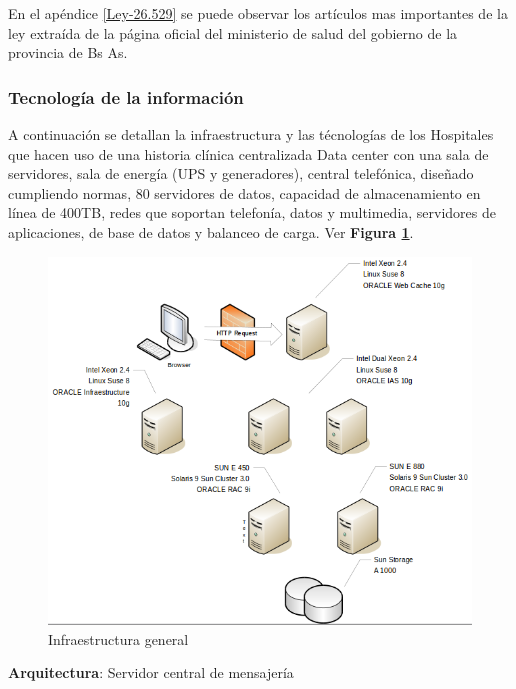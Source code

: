 En el apéndice \ref{Ley-26.529} se puede observar los artículos mas importantes de la ley extraída de la página oficial del ministerio de salud del gobierno de la provincia de Bs As.




\subsubsection{Tecnología de la información}
 A continuación se detallan la infraestructura y las técnologías de los Hospitales que hacen uso de una historia clínica centralizada
 Data center con una sala de servidores, sala de energía (UPS y generadores), central telefónica, diseñado cumpliendo normas, 80 servidores de datos, capacidad de almacenamiento en línea de 400TB, redes que soportan telefonía, datos y multimedia, servidores de aplicaciones, de base de datos y balanceo de carga.
 Ver \textbf{Figura \ref{infgen}}.
 
\begin{figure}
  \centering
  \includegraphics[width=.8\textwidth]{img/tp1/modeloGrande}
  \caption{Infraestructura general}
  \label{infgen}
\end{figure}

    \textbf{Arquitectura}: Servidor central de mensajería 
    

